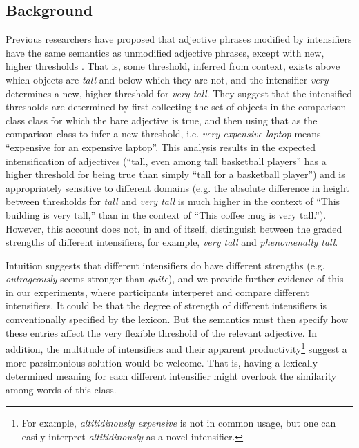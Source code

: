 \documentclass[10pt,letterpaper]{article}
\newcommand{\w}[1]{\emph{#1}}
\newcommand{\todo}[1]{{\color{red}#1}}
\begin{document}
\subsection{Background}
Previous researchers have proposed that adjective phrases modified by intensifiers have the same semantics as unmodified adjective phrases, except with new, higher thresholds \cite{kennedyMcnally, klein, wheeler}. That is, some threshold, inferred from context, exists above which objects are \w{tall} and below which they are not, and the intensifier \w{very} determines a new, higher threshold for \w{very tall}.
They suggest that the intensified thresholds are determined by first collecting the set of objects in the comparison class class for which the bare adjective is true, and then using that as the comparison class to infer a new threshold, i.e. \w{very expensive laptop} means ``expensive for an expensive laptop''. This analysis results in the expected intensification of adjectives (``tall, even among tall basketball players'' has a higher threshold for being true than simply ``tall for a basketball player'') and is appropriately sensitive to different domains (e.g. the absolute difference in height between thresholds for \w{tall} and \w{very tall} is much higher in the context of ``This building is very tall,'' than in the context of ``This coffee mug is very tall.'').
However, this account does not, in and of itself, distinguish between the graded strengths of different intensifiers, for example, \w{very tall} and \w{phenomenally tall}.

Intuition suggests that different intensifiers do have different strengths (e.g. \w{outrageously} seems stronger than \w{quite}), and we provide further evidence of this in our experiments, where participants interperet and compare different intensifiers.
It could be that the degree of strength of different intensifiers is conventionally specified by the lexicon. But the semantics must then specify how these entries affect the very flexible threshold of the relevant adjective.
In addition, the multitude of intensifiers \cite{bolinger} and their apparent productivity\footnote{For example, \w{altitidinously expensive} is not in common usage, but one can easily interpret \w{altitidinously} as a novel intensifier.} suggest a more parsimonious solution would be welcome. 
That is, having a lexically determined meaning for each different intensifier might overlook the similarity among words of this class.
\end{document}

